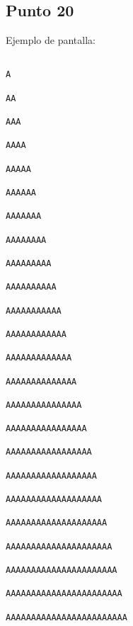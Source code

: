 



\subsection{Punto 20}
	
	Ejemplo de pantalla:
\begin{lstlisting}
                                                                                A
                                                                               AA
                                                                              AAA
                                                                             AAAA
                                                                            AAAAA
                                                                           AAAAAA
                                                                          AAAAAAA
                                                                         AAAAAAAA
                                                                        AAAAAAAAA
                                                                       AAAAAAAAAA
                                                                      AAAAAAAAAAA
                                                                     AAAAAAAAAAAA
                                                                    AAAAAAAAAAAAA
                                                                   AAAAAAAAAAAAAA
                                                                  AAAAAAAAAAAAAAA
                                                                 AAAAAAAAAAAAAAAA
                                                                AAAAAAAAAAAAAAAAA
                                                               AAAAAAAAAAAAAAAAAA
                                                              AAAAAAAAAAAAAAAAAAA
                                                             AAAAAAAAAAAAAAAAAAAA
                                                            AAAAAAAAAAAAAAAAAAAAA
                                                           AAAAAAAAAAAAAAAAAAAAAA
                                                          AAAAAAAAAAAAAAAAAAAAAAA
                                                         AAAAAAAAAAAAAAAAAAAAAAAA
\end{lstlisting}

